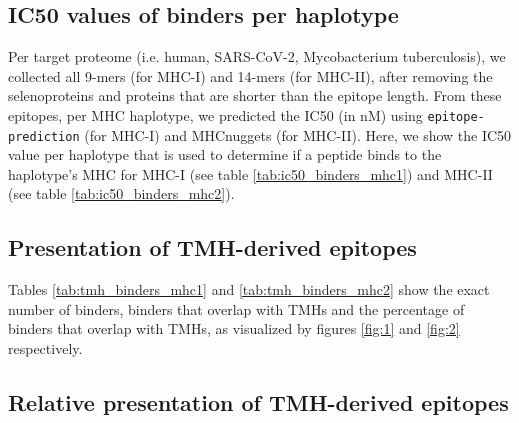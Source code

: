 \subsection{IC50 values of binders per haplotype}
\label{subsec:ic50s_per_haplotype}

Per target proteome (i.e. human, SARS-CoV-2, Mycobacterium tuberculosis),
we collected all 9-mers (for MHC-I) and 14-mers (for MHC-II),
after removing the selenoproteins and proteins that are shorter
than the epitope length.
From these epitopes, per MHC haplotype,
we predicted the IC50 (in nM) using \verb;epitope-prediction; (for MHC-I)
and MHCnuggets (for MHC-II). 
Here, we show the IC50 value per haplotype that
is used to determine if a peptide binds to the haplotype's MHC
for MHC-I (see table \ref{tab:ic50_binders_mhc1}) and 
MHC-II (see table \ref{tab:ic50_binders_mhc2}).





\subsection{Presentation of TMH-derived epitopes}

Tables \ref{tab:tmh_binders_mhc1} and \ref{tab:tmh_binders_mhc2}
show the exact number of binders, binders that overlap with TMHs
and the percentage of binders that overlap with TMHs, as
visualized by figures \ref{fig:1} and \ref{fig:2} respectively.





\subsection{Relative presentation of TMH-derived epitopes}


